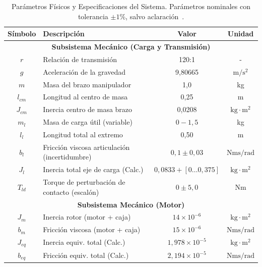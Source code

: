 \documentclass[12pt, a4paper,journal, onecolumn, compsoc]{IEEEtran}
\begin{document}
\begin{table}[htbp]
    \caption{Parámetros Físicos y Especificaciones del Sistema. Parámetros nominales con tolerancia $\pm 1\%$, salvo aclaración~\cite{guia_trabajo}.}
    \centering
    \renewcommand{\arraystretch}{1.2} %
    \begin{tabular}{|c|l|c|c|}
        \hline
        \textbf{Símbolo} & \textbf{Descripción} & \textbf{Valor} & \textbf{Unidad} \\
        \hline
        \multicolumn{4}{|c|}{\textbf{Subsistema Mecánico (Carga y Transmisión)}} \\
        \hline
        $r$ & Relación de transmisión & 120:1 & - \\
        $g$ & Aceleración de la gravedad & 9{,}80665 & $\text{m}/\text{s}^2$ \\
        $m$ & Masa del brazo manipulador & 1{,}0 & kg \\
        $l_{cm}$ & Longitud al centro de masa & 0{,}25 & m \\
        $J_{cm}$ & Inercia centro de masa brazo & 0{,}0208 & $\text{kg}\cdot\text{m}^2$ \\
        $m_l$ & Masa de carga útil (variable) & $0 - 1{,}5$ & kg \\
        $l_{l}$ & Longitud total al extremo & 0{,}50 & m \\
        $b_{l}$ & Fricción viscosa articulación (incertidumbre) & $0{,}1 \pm 0{,}03$ & $\text{Nms}/\text{rad}$ \\
        $J_l$ & Inercia total eje de carga (Calc.) & $0{,}0833 + [0\ldots0{,}375]$ & $\text{kg}\cdot\text{m}^2$ \\
        $T_{ld}$ & Torque de perturbación de contacto (escalón) & $0 \pm 5{,}0$ & Nm \\
        \hline
        \multicolumn{4}{|c|}{\textbf{Subsistema Mecánico (Motor)}} \\
        \hline
        $J_m$ & Inercia rotor (motor + caja) & $14 \times 10^{-6}$ & $\text{kg}\cdot\text{m}^2$ \\
        $b_m$ & Fricción viscosa (motor + caja) & $15 \times 10^{-6}$ & $\text{Nms}/\text{rad}$ \\
        $J_{eq}$ & Inercia equiv. total (Calc.) & $1{,}978 \times 10^{-5}$ & $\text{kg}\cdot\text{m}^2$ \\
        $b_{eq}$ & Fricción equiv. total (Calc.) & $2{,}194 \times 10^{-5}$ & $\text{Nms}/\text{rad}$ \\

\end{tabular}
\end{table}
\end{document}
